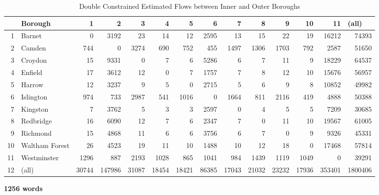 \documentclass[11pt]{article} %
\begin{document}
\begin{table}
\footnotesize
\caption{Double Constrained Estimated Flows between Inner and Outer Boroughs}
\begin{tabular}{|r|l|r|r|r|r|r|r|r|r|r|r|r|r|}
\hline
\multicolumn{1}{|l|}{} & Borough & 1 & 2 & 3 & 4 & 5 & 6 & 7 & 8 & 9 & 10 & 11 & \multicolumn{1}{l|}{(all)} \\ \hline
1 & Barnet & 0 & 3192 & 23 & 14 & 12 & 2595 & 13 & 15 & 22 & 19 & 16212 & 74393 \\ \hline
2 & Camden & 744 & 0 & 3274 & 690 & 752 & 455 & 1497 & 1306 & 1703 & 792 & 2587 & 51650 \\ \hline
3 & Croydon & 15 & 9331 & 0 & 7 & 6 & 5286 & 6 & 7 & 11 & 9 & 18229 & 64537 \\ \hline
4 & Enfield & 17 & 3612 & 12 & 0 & 7 & 1757 & 7 & 8 & 12 & 10 & 15676 & 56957 \\ \hline
5 & Harrow & 12 & 3237 & 9 & 5 & 0 & 2715 & 5 & 6 & 9 & 8 & 10852 & 49982 \\ \hline
6 & Islington & 974 & 733 & 2987 & 541 & 1016 & 0 & 1664 & 811 & 2116 & 419 & 4888 & 50388 \\ \hline
7 & Kingston & 7 & 3762 & 5 & 3 & 3 & 2597 & 0 & 4 & 5 & 5 & 7209 & 30685 \\ \hline
8 & Redbridge & 16 & 6090 & 12 & 7 & 6 & 2347 & 7 & 0 & 11 & 10 & 19567 & 61005 \\ \hline
9 & Richmond & 15 & 4868 & 11 & 6 & 6 & 3756 & 6 & 7 & 0 & 9 & 9326 & 45331 \\ \hline
10 & Waltham Forest & 26 & 4523 & 19 & 11 & 10 & 1488 & 10 & 12 & 18 & 0 & 17468 & 57814 \\ \hline
11 & Westminster & 1296 & 887 & 2193 & 1028 & 865 & 1041 & 984 & 1439 & 1119 & 1049 & 0 & 39291 \\ \hline
12 & (all) & 30744 & 147986 & 31087 & 18454 & 18421 & 86385 & 17043 & 21032 & 23232 & 17936 & 353401 & 1800406 \\ \hline
\end{tabular}
\label{Estimated Flows Double}
\end{table}


\textbf{1256 words}



%
%
%
\end{document}

